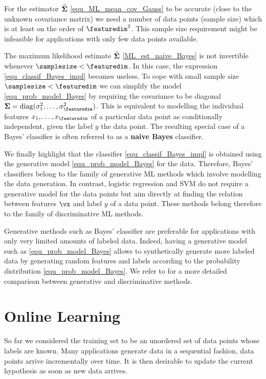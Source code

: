 \documentclass[12pt]{report}
\begin{document}
For the estimator $\widehat{\bf \Sigma}$ \eqref{equ_ML_mean_cov_Gauss} 
to be accurate (close to the unknown covariance matrix) we need a number 
of data points (sample size) which is at least on the order of $\featuredim^{2}$. 
This sample size requirement might be infeasible for applications with only few 
data points available. 

The maximum likelihood estimate $\widehat{\bf \Sigma}$ \eqref{ML_est_naive_Bayes} 
is not invertible whenever $\samplesize < \featuredim$. In this case, the expression 
\eqref{equ_classif_Bayes_impl} becomes useless. To cope with small sample size 
$\samplesize < \featuredim$ we can simplify the model \eqref{equ_prob_model_Bayes} 
by requiring the covariance to be diagonal ${\bf \Sigma} = {\rm diag} (\sigma_{1}^{2}, \ldots, \sigma_{\featuredim}^{2})$. 
This is equivalent to modelling the individual features $x_{1},\ldots,x_{\featuredim}$ 
of a particular data point as conditionally independent, given the label $y$ the data 
point. The resulting special case of a Bayes' classifier is often referred to as a 
{\bf naive Bayes} classifier. 

We finally highlight that the classifier \eqref{equ_classif_Bayes_impl} 
is obtained using the generative model \eqref{equ_prob_model_Bayes} 
for the data. Therefore, Bayes' classifiers belong to the family of generative 
ML methods which involve modelling the data generation. In contrast, 
logistic regression and SVM do not require a generative model for the 
data points but aim directly at finding the relation between features $\vx$ 
and label $y$ of a data point. These methods belong therefore to the 
family of discriminative ML methods. 


Generative methods such as Bayes' classifier are preferable for 
applications with only very limited amounts of labeled data. Indeed, 
having a generative model such as \eqref{equ_prob_model_Bayes} 
allows to synthetically generate more labeled data by generating 
random features and labels according to the probability distribution 
\eqref{equ_prob_model_Bayes}. We refer to \cite{NIPS2001_2020} 
for a more detailed comparison between generative and discriminative 
methods. 

\section{Online Learning} 
\label{sec_online_learning}

So far we considered the training set to be an unordered set of data points 
whose labels are known. Many applications generate data in a sequential 
fashion, data points arrive incrementally over time. It is then desirable to update 
the current hypothesis as soon as new data arrives. 
\end{document}
